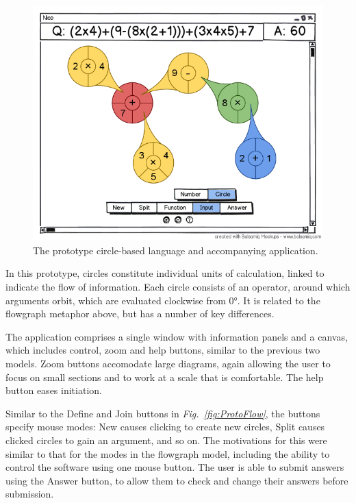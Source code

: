 \documentclass[12pt,twoside,notitlepage,xetex]{report}
\begin{document}
\begin{figure}[H]
\begin{center}
\includegraphics[width=\textwidth]{figs/mockups/circles/nico_circmock.png}
\caption{The prototype circle-based language and accompanying application.}
\label{fig:ProtoCirc}
\end{center}
\end{figure}

In this prototype, circles constitute individual units of calculation, linked to indicate the flow of information. Each circle consists of an operator, around which arguments orbit, which are evaluated clockwise from 0°.  It is related to the flowgraph metaphor above, but has a number of key differences.

The application comprises a single window with information panels and a canvas, which includes control, zoom and help buttons, similar to the previous two models.  Zoom buttons accomodate large diagrams, again allowing the user to focus on small sections and to work at a scale that is comfortable.  The help button eases initiation.

Similar to the {\sfapp Define} and {\sfapp Join} buttons in \emph{Fig.~\ref{fig:ProtoFlow}}, the buttons specify mouse modes: {\sfapp New} causes clicking to create new circles, {\sfapp Split} causes clicked circles to gain an argument, and so on. The motivations for this were similar to that for the modes in the flowgraph model, including the ability to control the software using one mouse button.  The user is able to submit answers using the {\sfapp Answer} button, to allow them to check and change their answers before submission.
\end{document}
